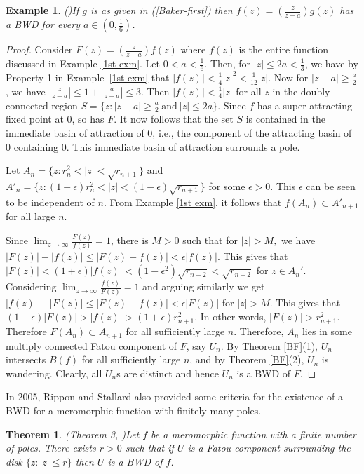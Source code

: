 \documentclass[11pt,a4paper]{article}
\newtheorem{theorem}{Theorem}[section]
\newtheorem{example}{Example}[section]
\begin{document}
\begin{example}(\cite{RipponStallard 2005(1)})\label{Exm 3}
	If $g$ is as given in (\ref{Baker-first}) then  $f(z)=\left(\frac{z}{z-a}\right) g(z)$ has a BWD for every $a \in (0, \frac{1}{6})$.
\end{example}
\begin{proof}
	Consider $F(z)=\left(\frac{z}{z-a}\right) f(z)$ where $f(z)$ is the entire function discussed in Example \ref{1st exm}. Let $0<a<\frac{1}{6}$. Then, for $|z| \leq 2a < \frac{1}{3}$, we have by Property 1 in Example~\ref{1st exm} that     $|f(z)| < \frac{1}{4} |z|^2 < \frac{1}{12}|z|$.   Now  for $|z-a|\geq\frac{a}{2}$, we have $|\frac{z}{z-a}|\leq 1+|\frac{a}{z-a}|\leq 3$. Then $|f(z)| < \frac{1}{4}|z|$ for all $z$ in the doubly connected region $S= \{z: |z-a|\geq\frac{a}{2} ~\mbox{and}~ |z|\leq 2a \}$. Since $f$ has a super-attracting fixed point at $0$, so has $F$. It now follows that the set $S$ is contained in the immediate basin of attraction of $0$, i.e., the component of the attracting basin of $0$ containing $0$. This immediate basin of attraction surrounds a pole. \par Let $A_n=\{z:r_n^2<|z|<\sqrt{r_{n+1}}\}$ and $A'_n=\{z:(1+\epsilon)r_n^2<|z|<(1-\epsilon)\sqrt{r_{n+1}}\}$ for some $\epsilon >0$. This $\epsilon$ can be seen to be independent of $n$. From Example \ref{1st exm}, it follows that $f(A_n)\subset A'_{n+1}$  for all large $n$. 
	
	Since $\lim_{z \to \infty}
	\frac{F(z)}{f(z)} = 1$, there is $M>0$ such that for $|z|>M,$ we have $ |F(z)|- |f(z)| \leq |F(z)- f(z)|< \epsilon |f(z)|$. This gives that $
	|F(z)| < (1+\epsilon) |f(z)|< (1-\epsilon^2) \sqrt{r_{n+2} }<\sqrt{r_{n+2} }$ for $z \in A_n '$. Considering 
	 $\lim_{z \to \infty}
	\frac{f(z)}{F(z)} = 1$ and arguing similarly we get $|f(z)|-|F(z)| \leq |F(z)-f(z)|< \epsilon |F(z)|$ for $|z|>M$. This gives that $(1+\epsilon)|F(z)| >|f(z)|> (1+\epsilon) r_{n+1}^2$. In other words, $|F(z)| > r_{n+1}^2$. Therefore $F(A_n) \subset A_{n+1}$  for all sufficiently large $n$. Therefore, $A_n$ lies in some multiply connected Fatou component of $F$, say $U_n$. By Theorem \ref{BF}(1), $U_n$ intersects $B(f)$ for all sufficiently large $n$, and by Theorem \ref{BF}(2), $U_n$ is wandering. Clearly, all $U_n$s are distinct and hence $U_n$ is a BWD of $F$. 
	\end{proof}	
	In 2005, Rippon and Stallard also provided some criteria for the existence of a BWD for a meromorphic function with finitely many poles. 
	\begin{theorem}(Theorem 3, \cite{RipponStallard 2005(1)})\label{Thm2.7}
		Let $f$ be a meromorphic function with a finite number of poles. There exists $r>0$ such that if $U$ is a Fatou component surrounding the disk $\{z:|z|\leq r\}$ then $U$ is a BWD of $f$.	
	\end{theorem}
\end{document}
